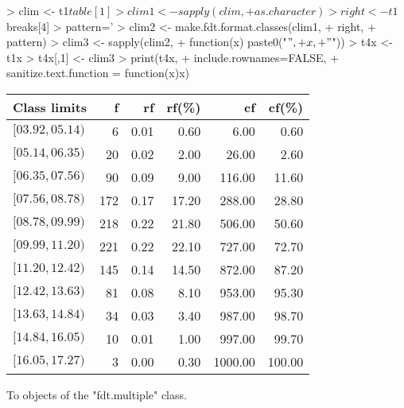 \documentclass[10pt,a4paper]{article}
\begin{document}
\begin{Schunk}
\begin{Sinput}
> clim <- t1$table[1]
> clim1 <- sapply(clim,
+                 as.character)
> right <- t1$breaks[4]
> pattern='%05.2f'
> clim2 <- make.fdt.format.classes(clim1,
+                                  right,
+                                  pattern)
> clim3 <- sapply(clim2,
+                 function(x) paste0("$",
+                                    x,
+                                    "$"))
> t4x <- t1x
> t4x[,1] <- clim3
> print(t4x,
+       include.rownames=FALSE,
+       sanitize.text.function = function(x){x})
\end{Sinput}
% latex table generated in R 4.4.0 by xtable 1.8-4 package
% Fri Nov 17 16:34:40 2023
\begin{table}[ht]
\centering
\begin{tabular}{lrrrrr}
  \hline
Class limits & f & rf & rf(\%) & cf & cf(\%) \\ 
  \hline
$[03.92, 05.14)$ &   6 & 0.01 & 0.60 & 6.00 & 0.60 \\ 
  $[05.14, 06.35)$ &  20 & 0.02 & 2.00 & 26.00 & 2.60 \\ 
  $[06.35, 07.56)$ &  90 & 0.09 & 9.00 & 116.00 & 11.60 \\ 
  $[07.56, 08.78)$ & 172 & 0.17 & 17.20 & 288.00 & 28.80 \\ 
  $[08.78, 09.99)$ & 218 & 0.22 & 21.80 & 506.00 & 50.60 \\ 
  $[09.99, 11.20)$ & 221 & 0.22 & 22.10 & 727.00 & 72.70 \\ 
  $[11.20, 12.42)$ & 145 & 0.14 & 14.50 & 872.00 & 87.20 \\ 
  $[12.42, 13.63)$ &  81 & 0.08 & 8.10 & 953.00 & 95.30 \\ 
  $[13.63, 14.84)$ &  34 & 0.03 & 3.40 & 987.00 & 98.70 \\ 
  $[14.84, 16.05)$ &  10 & 0.01 & 1.00 & 997.00 & 99.70 \\ 
  $[16.05, 17.27)$ &   3 & 0.00 & 0.30 & 1000.00 & 100.00 \\ 
   \hline
\end{tabular}
\end{table}\end{Schunk}

To objects of the "fdt.multiple" class.
\end{document}
